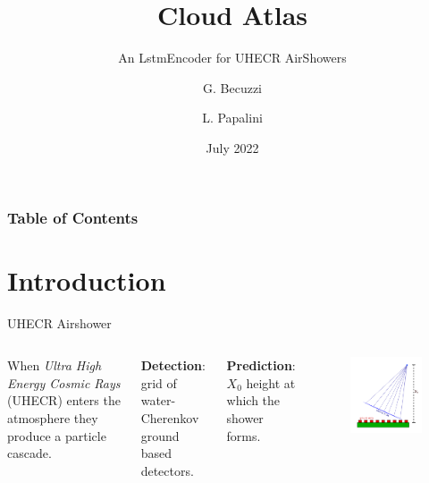 \documentclass{beamer}
\title[Cloud Atlas] %
{Cloud Atlas}
\subtitle{An LstmEncoder for UHECR AirShowers}
\author[Gianluca Becuzzi, Lucia Papalini] %
{G. Becuzzi \and L. Papalini}
\date[July 2022] %
{July 2022}
\begin{document}
\frame{\titlepage}


\begin{frame}
\frametitle{Table of Contents}
\tableofcontents
\end{frame}


\section{Introduction}

\begin{frame}{UHECR Airshower}

    \begin{columns}
    
    When \textit{Ultra High Energy Cosmic Rays} (UHECR) enters the atmosphere they produce a particle cascade.\\
    \vspace{15 pt}
    
    \textbf{Detection}: grid of water-Cherenkov ground based detectors.
    \vspace{10 pt}
    
    \textbf{Prediction}: $X_0$ height at which the shower forms.
    
    
        \begin{figure}
            \centering
            \includegraphics[width=\textwidth]{figures/airshower.png}
        \end{figure}
        
    
    \end{columns}
\end{frame}
\end{document}
